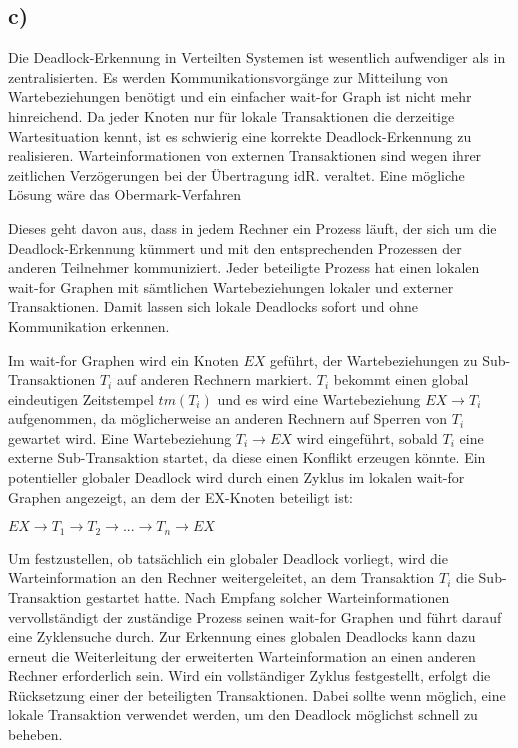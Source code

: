 \documentclass[ngerman]{fbi-aufgabenblatt}
\begin{document}
\setcounter{section}{1}

\subsection*{c)}
Die Deadlock-Erkennung in Verteilten Systemen ist wesentlich aufwendiger als in zentralisierten. Es werden Kommunikationsvorgänge zur Mitteilung von Wartebeziehungen benötigt und ein einfacher wait-for Graph ist nicht mehr hinreichend.
 Da jeder Knoten nur für lokale Transaktionen die derzeitige Wartesituation kennt, ist es schwierig eine korrekte Deadlock-Erkennung zu realisieren. Warteinformationen von externen Transaktionen sind wegen ihrer zeitlichen Verzögerungen bei der Übertragung idR. veraltet. 
Eine mögliche Lösung wäre das Obermark-Verfahren

Dieses geht davon aus, dass in jedem Rechner ein Prozess läuft, der sich um die Deadlock-Erkennung kümmert und mit den entsprechenden Prozessen der anderen Teilnehmer kommuniziert. Jeder beteiligte Prozess hat einen lokalen wait-for Graphen mit sämtlichen Wartebeziehungen lokaler und externer Transaktionen. Damit lassen sich lokale Deadlocks sofort und ohne Kommunikation erkennen. 

Im wait-for Graphen wird ein Knoten $EX$ geführt, der Wartebeziehungen zu Sub-Transaktionen $T_{i}$ auf anderen Rechnern markiert. $T_{i}$ bekommt einen global eindeutigen Zeitstempel $tm(T_{i})$ und es wird 
eine Wartebeziehung $EX \rightarrow T_{i}$ aufgenommen, da möglicherweise an anderen Rechnern auf Sperren von $T_{i}$ gewartet wird. Eine Wartebeziehung $T_{i} \rightarrow EX$ wird eingeführt, sobald $T_{i}$ eine externe Sub-Transaktion startet, da diese einen Konflikt erzeugen könnte. Ein potentieller globaler Deadlock wird durch einen Zyklus im lokalen wait-for Graphen angezeigt, an dem der EX-Knoten beteiligt ist:

$EX \rightarrow T_{1} \rightarrow T_{2} \rightarrow ... \rightarrow T_{n} \rightarrow EX$

Um festzustellen, ob tatsächlich ein globaler Deadlock vorliegt, wird die Warteinformation an den Rechner weitergeleitet, an dem Transaktion $T_{i}$ die Sub-Transaktion gestartet hatte. Nach Empfang solcher Warteinformationen vervollständigt der zuständige Prozess seinen wait-for Graphen und führt darauf eine Zyklensuche durch. Zur Erkennung eines globalen Deadlocks kann dazu erneut die Weiterleitung der erweiterten Warteinformation an einen anderen Rechner erforderlich sein. Wird ein vollständiger Zyklus festgestellt, erfolgt die Rücksetzung einer der beteiligten Transaktionen. Dabei sollte wenn möglich, eine lokale Transaktion verwendet werden, um den Deadlock möglichst schnell zu beheben.
\end{document}

